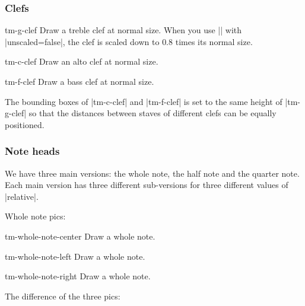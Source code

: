 \subsubsection{Clefs}\label{sec:out:pic:clef}
\begin{pictype}{tm-g-clef}{}
  Draw a treble clef at normal size. When you use |\tmgclef| with |unscaled=false|, 
  the clef is scaled down to $0.8$ times its normal size.
\end{pictype}
\begin{pictype}{tm-c-clef}{}
  Draw an alto clef at normal size.
\end{pictype}
\begin{pictype}{tm-f-clef}{}
  Draw a bass clef at normal size.
\end{pictype}
\begin{codeexample}[]
\end{codeexample}
The bounding boxes of |tm-c-clef| and |tm-f-clef| is set to the same height of 
|tm-g-clef| so that the distances between staves of different clefs can be 
equally positioned.
\subsubsection{Note heads}\label{sec:out:pic:noteheads}
We have three main versions: the whole note, the half note and the quarter note. 
Each main version has three different sub-versions for three different values of 
|relative|.

Whole note pics:
\begin{pictype}{tm-whole-note-center}{}
  Draw a whole note.
\end{pictype}
\begin{pictype}{tm-whole-note-left}{}
  Draw a whole note.
\end{pictype}
\begin{pictype}{tm-whole-note-right}{}
  Draw a whole note.
\end{pictype}
The difference of the three pics:
\begin{codeexample}[]
\end{codeexample}

